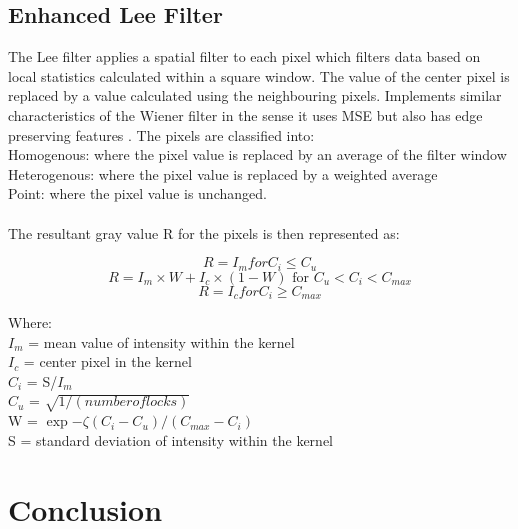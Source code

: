 \documentclass[%
reprint,
showpacs,preprintnumbers,
bibnotes,
amsmath,amssymb,
aps,
pra,
]{revtex4-1}
\begin{document}
\subsection{\label{sec:level2} Enhanced Lee Filter}
The Lee filter applies a spatial filter to each pixel which filters data based on local statistics calculated within a square window. The value of the center pixel is replaced by a value calculated using the neighbouring pixels. Implements similar characteristics of the Wiener filter in the sense it uses MSE but also has edge preserving features \cite{leefilter}. The pixels are classified into:
\\
Homogenous: where the pixel value is replaced by an average of the filter window
\\
Heterogenous: where the pixel value is replaced by a weighted average
\\
Point: where the pixel value is unchanged.
\\
\\
The resultant gray value R for the pixels is then represented as:

$$R = I_{m} for C_{i} \leq C_{u}$$
$$R = I_{m} \times W+I_{c} \times (1-W) \text{ for } C_{u}<C_{i}<C_{max}$$
$$R = I_{c} for C_{i} \geq C_{max}$$

Where:
\\
	$I_{m}$ = mean value of intensity within the kernel
	\\
	$I_{c}$ = center pixel in the kernel
	\\
	$C_{i}$ = S/$I_{m}$
	\\
	$C_{u}$ = $\sqrt{1/(number of locks)}$
	\\
	W				= $\exp{-\zeta(C_{i}-C_{u})/(C_{max}-C_{i})}$
	\\
	S       = standard deviation of intensity within the kernel
	\cite{radarlee}




	\section{\label{sec:level1} Conclusion}





	
\end{document}

